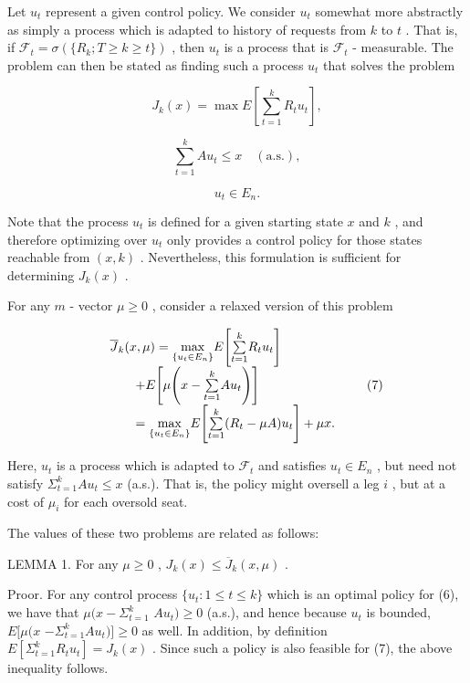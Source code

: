Let \(u_{t}\) represent a given control policy. We consider \(u_{t}\)
somewhat more abstractly as simply a process which is adapted to history
of requests from \(k\) to \(t\) . That is, if
\(\mathcal{F}_{t} = \sigma (\{R_{k}; T \geq k \geq t\})\) , then
\(u_{t}\) is a process that is \(\mathcal{F}_{t}\) - measurable. The
problem can then be stated as finding such a process \(u_{t}\) that
solves the problem

\[
J_{k}(x) = \max E\left[\sum_{t = 1}^{k}R_{t}u_{t}\right],
\]

\[
\sum_{t = 1}^{k}A u_{t}\leq x\quad (\mathrm{a.s.}),
\]

\[
u_{t}\in E_{n}. \tag{6}
\]

Note that the process \(u_{t}\) is defined for a given starting state
\(x\) and \(k\) , and therefore optimizing over \(u_{t}\) only provides
a control policy for those states reachable from \((x, k)\) .
Nevertheless, this formulation is sufficient for determining
\(J_{k}(x)\) .

For any \(m\) - vector \(\mu \geq 0\) , consider a relaxed version of
this problem

\[
\begin{array}{r l} & {\overline{{J}}_{k}(x,\mu) = \underset {\{u_{t}\in E_{n}\}}{\max}E\Bigg[\underset {t = 1}{\overset{k}{\sum}}R_{t}u_{t}\Bigg]}\\ & {\qquad +E\Bigg[\mu \Bigg(x - \underset {t = 1}{\overset{k}{\sum}}A u_{t}\Bigg)\Bigg]}\\ & {\qquad = \underset {\{u_{t}\in E_{n}\}}{\max}E\Bigg[\underset {t = 1}{\overset{k}{\sum}}(R_{t} - \mu A)u_{t}\Bigg] + \mu x.} \end{array} \tag{7}
\]

Here, \(u_{t}\) is a process which is adapted to \(\mathcal{F}_{t}\) and
satisfies \(u_{t} \in E_{n}\) , but need not satisfy
\(\Sigma_{t = 1}^{k}A u_{t} \leq x\) (a.s.). That is, the policy might
oversell a leg \(i\) , but at a cost of \(\mu_{i}\) for each oversold
seat.

The values of these two problems are related as follows:

LEMMA 1. For any \(\mu \geq 0\) ,
\(J_{k}(x) \leq \overline{J}_{k}(x, \mu)\) .

Proor. For any control process \(\{u_{t}:1\leq t\leq k\}\) which is an
optimal policy for (6), we have that \(\mu (x - \Sigma_{t = 1}^{k}\)
\(A u_{t})\geq 0\) (a.s.), and hence because \(u_{t}\) is bounded,
\(E[\mu (x\) \(- \Sigma_{t = 1}^{k}A u_{t})]\geq 0\) as well. In
addition, by definition \(E[\Sigma_{t = 1}^{k}R_{t}u_{t}] = J_{k}(x)\) .
Since such a policy is also feasible for (7), the above inequality
follows.

